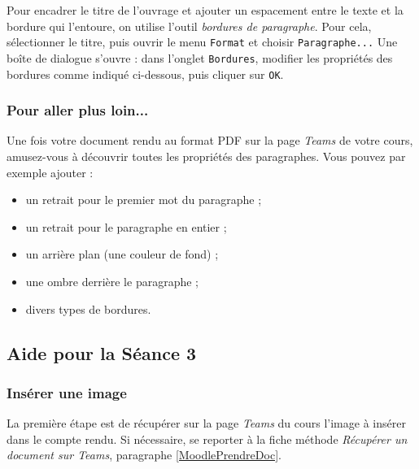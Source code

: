 Pour encadrer le titre de l'ouvrage et ajouter un espacement entre le texte et la bordure qui l'entoure, on utilise l'outil \emph{bordures de paragraphe}. Pour cela, sélectionner le titre, puis ouvrir le menu \texttt{Format} et choisir \texttt{Paragraphe...} Une boîte de dialogue s'ouvre : dans l'onglet \texttt{Bordures}, modifier les propriétés des bordures comme indiqué ci-dessous, puis cliquer sur \texttt{OK}.




\subsubsection{Pour aller plus loin...}

Une fois votre document rendu au format PDF sur la page \emph{Teams} de votre cours, amusez-vous à découvrir toutes les propriétés des paragraphes. Vous pouvez par exemple ajouter :
\begin{itemize}
\item un retrait pour le premier mot du paragraphe ;
\item un retrait pour le paragraphe en entier ; 
\item un arrière plan (une couleur de fond) ;
\item une ombre derrière le paragraphe ; 
\item divers types de bordures. 
\end{itemize}


%
%
%
%


\subsection{Aide pour la Séance 3}\label{correction_texte03}



\subsubsection{Insérer une image}

La première étape est de récupérer sur la page \emph{Teams} du cours l'image à insérer dans le compte rendu. Si nécessaire, se reporter à la fiche méthode \emph{Récupérer un document sur Teams}, paragraphe \vref{MoodlePrendreDoc}.

\vspace{12pt}

